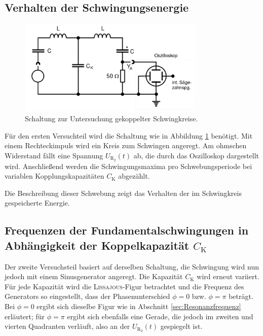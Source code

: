 \subsection{Verhalten der Schwingungsenergie}
\begin{figure}[h]
	\centering
		\includegraphics[width=0.8\textwidth]{Bilder/Versuchsaufbau.pdf}		
\caption{Schaltung zur Untersuchung gekoppelter Schwingkreise. \cite{v355}}
	\label{fig:versuchsaufbau}
\end{figure}
Für den ersten Versuchteil wird die Schaltung wie in Abbildung \ref{fig:versuchsaufbau} benötigt. 
Mit einem Rechteckimpuls wird ein Kreis zum Schwingen angeregt. 
Am ohmschen Widerstand fällt eine Spannung $U_\mathup{R_2}(t)$ ab, die durch das Oszilloskop dargestellt wird. 
Anschließend werden die Schwingungsmaxima pro Schwebungsperiode bei variablen Kopplungskapazitäten $C_\mathup{K}$ abgezählt.

Die Beschreibung dieser Schwebung zeigt das Verhalten der im Schwingkreis gespeicherte Energie.

\subsection{Frequenzen der Fundamentalschwingungen in Abhängigkeit der Koppelkapazität $C_\text{K}$}
Der zweite Versuchsteil basiert auf derselben Schaltung, die Schwingung wird nun jedoch mit einem Sinusgenerator angeregt.
Die Kapazität $C_\mathup{K}$ wird erneut variiert. 
Für jede Kapazität wird die \textsc{Lissajous}-Figur betrachtet und die Frequenz des Generators so eingestellt, dass der Phasenunterschied $\phi=0$ bzw. $\phi=\pi$ beträgt. 
Bei $\phi=0$ ergibt sich dieselbe Figur wie in Abschnitt \ref{sec:Resonanzfrequenz} erläutert; 
für $\phi=\pi$  ergibt sich ebenfalls eine Gerade, die jedoch im zweiten und vierten Quadranten verläuft, also an der $U_\mathup{R_2}(t)$ gespiegelt ist.

